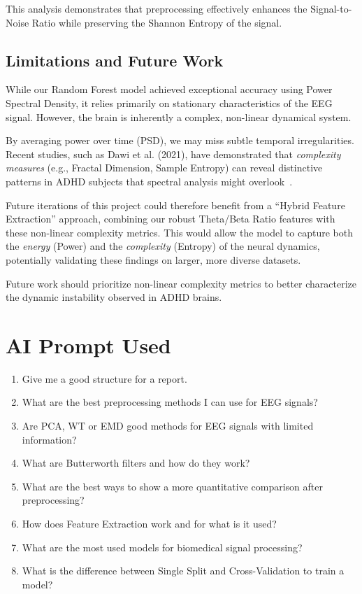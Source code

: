 \documentclass[11pt,a4paper]{article}
\begin{document}
This analysis demonstrates that preprocessing effectively enhances the Signal-to-Noise Ratio while preserving the Shannon Entropy of the signal. 


\subsection{Limitations and Future Work}
While our Random Forest model achieved exceptional accuracy using Power Spectral Density, it relies primarily on stationary characteristics 
of the EEG signal. However, the brain is inherently a complex, non-linear dynamical system.

By averaging power over time (PSD), we may miss subtle temporal irregularities. Recent studies, such as Dawi et al. (2021), have demonstrated 
that \textit{complexity measures} (e.g., Fractal Dimension, Sample Entropy) can reveal distinctive patterns in ADHD subjects that spectral 
analysis might overlook~\cite{dawi2021complexity}.

Future iterations of this project could therefore benefit from a ``Hybrid Feature Extraction'' approach, combining our robust Theta/Beta Ratio 
features with these non-linear complexity metrics. This would allow the model to capture both the \textit{energy} (Power) and the 
\textit{complexity} (Entropy) of the neural dynamics, potentially validating these findings on larger, more diverse datasets.

Future work should prioritize non-linear complexity metrics to better characterize the dynamic instability observed in ADHD brains.

\newpage

\cleardoublepage
{}



\newpage

\section*{AI Prompt Used}
\begin{enumerate}
    \item Give me a good structure for a report.
    \item What are the best preprocessing methods I can use for EEG signals?
    \item Are PCA, WT or EMD good methods for EEG signals with limited information?
    \item What are Butterworth filters and how do they work?
    \item What are the best ways to show a more quantitative comparison after preprocessing?
    \item How does Feature Extraction work and for what is it used?
    \item What are the most used models for biomedical signal processing?
    \item What is the difference between Single Split and Cross-Validation to train a model?
\end{enumerate}
\end{document}
